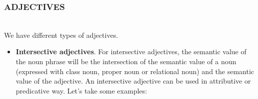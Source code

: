 \subsubsection{ADJECTIVES}\mbox{}\\
We have different types of adjectives.
\begin{itemize}
\item \textbf{Intersective adjectives}.
 For intersective adjectives, the semantic value of the
noun phrase will be the intersection of the semantic value of a noun (expressed with class noun, proper noun or relational noun) and the semantic value of the adjective. An intersective adjective can be used in attributive or predicative way. Let's take some examples:
\end{itemize}
